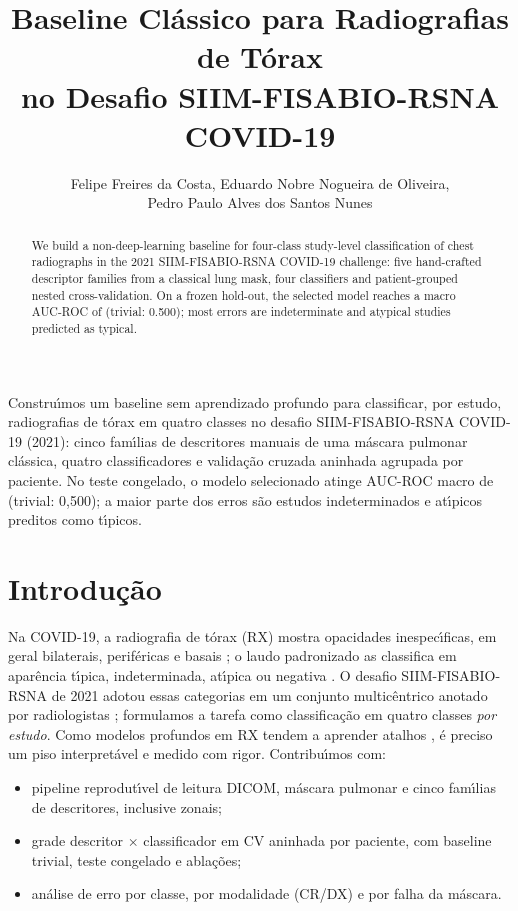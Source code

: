 \documentclass[12pt]{article}
\title{Baseline Cl\'assico para Radiografias de T\'orax\\no Desafio SIIM-FISABIO-RSNA COVID-19}
\author{Felipe Freires da Costa\inst{1}, Eduardo Nobre Nogueira de Oliveira\inst{1},\\
Pedro Paulo Alves dos Santos Nunes\inst{1}}
\begin{document}
\maketitle

\begin{abstract}
We build a non-deep-learning baseline for four-class study-level classification of chest
radiographs in the 2021 SIIM-FISABIO-RSNA COVID-19 challenge: five hand-crafted descriptor
families from a classical lung mask, four classifiers and patient-grouped nested
cross-validation. On a frozen hold-out, the selected model reaches a macro AUC-ROC of
\TestAUCEn{} (trivial: 0.500); most errors are indeterminate and atypical studies predicted
as typical.
\end{abstract}

\begin{resumo}
Constru\'{\i}mos um baseline sem aprendizado profundo para classificar, por estudo,
radiografias de t\'orax em quatro classes no desafio SIIM-FISABIO-RSNA COVID-19 (2021): cinco
fam\'{\i}lias de descritores manuais de uma m\'ascara pulmonar cl\'assica, quatro classificadores
e valida\c{c}\~ao cruzada aninhada agrupada por paciente. No teste congelado, o modelo
selecionado atinge AUC-ROC macro de \TestAUC{} (trivial: 0,500); a maior parte dos erros s\~ao
estudos indeterminados e at\'{\i}picos preditos como t\'{\i}picos.
\end{resumo}

\section{Introdu\c{c}\~ao}

Na COVID-19, a radiografia de t\'orax (RX) mostra opacidades inespec\'{\i}ficas, em geral
bilaterais, perif\'ericas e basais \cite{wong2020frequency}; o laudo padronizado as classifica
em apar\^encia t\'{\i}pica, indeterminada, at\'{\i}pica ou negativa \cite{litmanovich2020review}. O desafio SIIM-FISABIO-RSNA de 2021 adotou essas categorias em
um conjunto multic\^entrico anotado por radiologistas \cite{lakhani2023siim}; formulamos a
tarefa como classifica\c{c}\~ao em quatro classes \emph{por estudo}. Como modelos profundos em RX
tendem a aprender atalhos \cite{degrave2021shortcuts}, \'e preciso um piso interpret\'avel e
medido com rigor. Contribu\'{\i}mos com:
\begin{itemize}
\item pipeline reprodut\'{\i}vel de leitura DICOM, m\'ascara pulmonar e cinco fam\'{\i}lias de
descritores, inclusive zonais;
\item grade descritor $\times$ classificador em CV aninhada por paciente, com baseline
trivial, teste congelado e abla\c{c}\~oes;
\item an\'alise de erro por classe, por modalidade (CR/DX) e por falha da m\'ascara.
\end{itemize}
\end{document}

